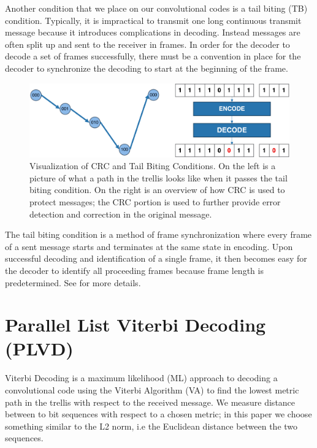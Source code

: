 Another condition that we place on our convolutional codes is a tail biting (TB) condition. Typically, it is impractical to transmit one long continuous transmit message because it introduces complications in decoding. Instead messages are often split up and sent to the receiver in frames. In order for the decoder to decode a set of frames successfully, there must be a convention in place for the decoder to synchronize the decoding to start at the beginning of the frame. 

\begin{figure}
\centering\CaptionFontSize
\includegraphics[width=\textwidth]
{Figures/code_conditions.png}
\caption[Visualization of CRC and Tail Biting Conditions]
{Visualization of CRC and Tail Biting Conditions. On the left is a picture of what a path in the trellis looks like when it passes the tail biting condition. On the right is an overview of how CRC is used to protect messages; the CRC portion is used to further provide error detection and correction in the original message.}
\label{Figure:Background:ConvolutionalCodeConditions}
\end{figure}
The tail biting condition is a method of frame synchronization where every frame of a sent message starts and terminates at the same state in encoding. Upon successful decoding and identification of a single frame, it then becomes easy for the decoder to identify all proceeding frames because frame length is predetermined. See \cite{Tailbiting} for more details.


\section{Parallel List Viterbi Decoding (PLVD)}

Viterbi Decoding is a maximum likelihood (ML) approach to decoding a convolutional code using the Viterbi Algorithm (VA) to find the lowest metric path in the trellis with respect to the received message. We measure distance between to bit sequences with respect to a chosen metric; in this paper we choose something similar to the L2 norm, i.e the Euclidean distance between the two sequences.

